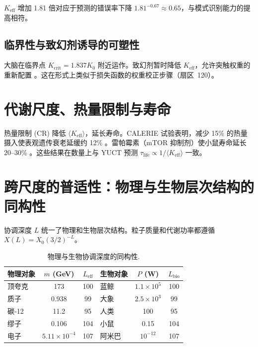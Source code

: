 \documentclass[11pt,a4paper]{article}
\begin{document}
	\(K_{\text{eff}}\) 增加 1.81 倍对应于预测的错误率下降 \(1.81^{-0.67} \approx 0.65\)，与模式识别能力的提高相符。
	
	\subsection{临界性与致幻剂诱导的可塑性}
	
	大脑在临界点 \(K_{\mathrm{crit}} = 1.837 K_0\) 附近运作。致幻剂暂时降低 \(K_{\text{eff}}\)，允许突触权重的重新配置 \cite{CarhartHarris2018, CarhartHarris2023}。这在形式上类似于损失函数的权重校正步骤（扇区~120）。
	
	\section{代谢尺度、热量限制与寿命}
	\label{sec:metabolism}
	
	热量限制 (CR) 降低 \(\langle K_{\text{eff}} \rangle\)，延长寿命。CALERIE 试验表明，减少 15\% 的热量摄入使表观遗传衰老延缓约 12\% \cite{CALERIE2018}。雷帕霉素（mTOR 抑制剂）使小鼠寿命延长 20–30\% \cite{Miller2022}。这些结果在数量上与 YUCT 预测 \(\tau_{\text{life}} \propto 1/\langle K_{\text{eff}} \rangle\) 一致。
	
	\section{跨尺度的普适性：物理与生物层次结构的同构性}
	\label{sec:isomorphism}
	
	协调深度 \(L\) 统一了物理和生物层次结构。粒子质量和代谢功率都遵循 \(X(L) = X_0 (3/2)^{-L}\)。
	
	\begin{table}[H]
		\centering
		\caption{物理与生物协调深度的同构性.}
		\label{tab:isomorphism}
		\begin{tabular}{l c c l c c}
			\toprule
			\textbf{物理对象} & \(m\) (GeV) & \(L_{\mathrm{eff}}\) & \textbf{生物对象} & \(P\) (W) & \(L_{\mathrm{bio}}\) \\
			\midrule
			顶夸克 & 173 & 100 & 蓝鲸 & \(1.1\times10^5\) & 100 \\
			质子 & 0.938 & 99 & 大象 & \(2.5\times10^3\) & 99 \\
			碳‑12 & 11.2 & 95 & 人类 & 100 & 95 \\
			缪子 & 0.106 & 104 & 小鼠 & 0.15 & 104 \\
			电子 & \(5.11\times10^{-4}\) & 107 & 阿米巴 & \(10^{-12}\) & 107 \\
			\bottomrule
		\end{tabular}
	\end{table}
	
\end{document}
